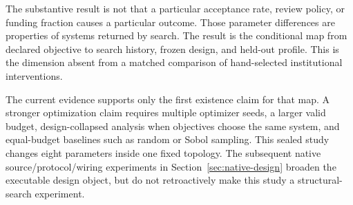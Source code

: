 The substantive result is not that a particular acceptance rate, review
policy, or funding fraction causes a particular outcome. Those parameter
differences are properties of systems returned by search. The result is the
conditional map from declared objective to search history, frozen design, and
held-out profile. This is the dimension absent from a matched comparison of
hand-selected institutional interventions.

The current evidence supports only the first existence claim for that map. A
stronger optimization claim requires multiple optimizer seeds, a larger valid
budget, design-collapsed analysis when objectives choose the same system, and
equal-budget baselines such as random or Sobol sampling. This sealed study
changes eight parameters inside one fixed topology. The subsequent native
source/protocol/wiring experiments in Section~\ref{sec:native-design} broaden
the executable design object, but do not retroactively make this study a
structural-search experiment.
